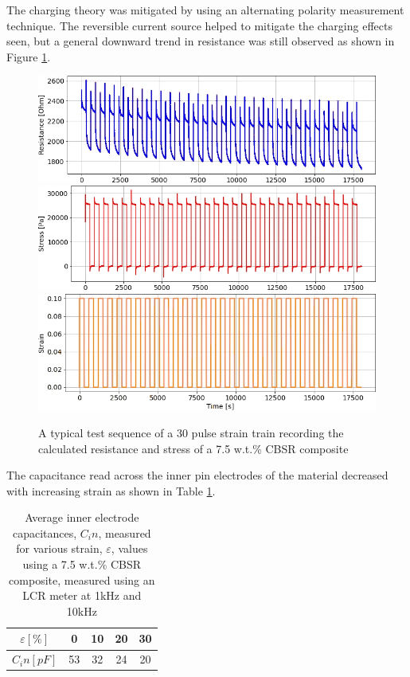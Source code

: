 The charging theory was mitigated by using an alternating polarity measurement technique. The reversible current source helped to mitigate the charging effects seen, but a general downward trend in resistance was still observed as shown in Figure \ref{fig:repeatability_pulse_trains}.  %
\begin{figure}[H]
	\centering
	\includegraphics[width=0.6\linewidth]{Figures/30_pulse_AC_2-7-5_Epin_20mm_v3_res.jpg}
	\vspace{0.2cm}
	\vfill
	\includegraphics[width=0.6\linewidth]{Figures/30_pulse_AC_2-7-5_Epin_20mm_v3_stress.jpg}
	\vspace{0.2cm}
	\vfill
	\includegraphics[width=0.59\linewidth]{Figures/30_pulse_AC_2-7-5_Epin_20mm_v3_strain.jpg}
	\caption{A typical test sequence of a 30 pulse strain train recording the calculated resistance and stress of a 7.5 w.t.\% CBSR composite}
	\label{fig:repeatability_pulse_trains}
\end{figure}



The capacitance read across the inner pin electrodes of the material decreased with increasing strain as shown in Table \ref{tab:capacitance_v_strain}.
\begin{table}[H]
	\centering
	\caption{Average inner electrode capacitances, $C_in$, measured for various strain, $\varepsilon$, values using a 7.5 w.t.\% CBSR composite, measured using an LCR meter at 1kHz and 10kHz \newline}
	\label{tab:capacitance_v_strain}
	\begin{tabular}{c|cccc}
		$\varepsilon [\%]$ & 0 & 10 & 20 & 30 \\
		\hline
		$C_in [pF]$ & 53 & 32 & 24 & 20 \\
	\end{tabular}
\end{table}


